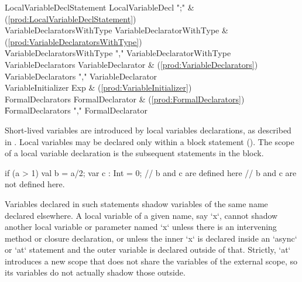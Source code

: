 \begin{bbgrammar}
LocalVariableDeclStatement \: LocalVariableDecl \xcd";" & (\ref{prod:LocalVariableDeclStatement}) \\
VariableDeclaratorsWithType \: VariableDeclaratorWithType & (\ref{prod:VariableDeclaratorsWithType}) \\
                    \| VariableDeclaratorsWithType \xcd"," VariableDeclaratorWithType \\
 VariableDeclarators \: VariableDeclarator & (\ref{prod:VariableDeclarators}) \\
                    \| VariableDeclarators \xcd"," VariableDeclarator \\
 VariableInitializer \: Exp & (\ref{prod:VariableInitializer}) \\
   FormalDeclarators \: FormalDeclarator & (\ref{prod:FormalDeclarators}) \\
                    \| FormalDeclarators \xcd"," FormalDeclarator \\
\end{bbgrammar}

Short-lived variables are introduced by local variables declarations, as
described in . Local variables may be declared only
within a block statement (). The scope of a local variable
declaration is the subsequent statements in the
block.   
\begin{xten}
  if (a > 1) {
     val b = a/2;
     var c : Int = 0;
     // b and c are defined here
  }
  // b and c are not defined here.
\end{xten}

Variables declared in such statements shadow variables of the same
name declared elsewhere.
A local variable of a given name, say \xcd`x`, cannot shadow another local
variable or parameter named \xcd`x` unless there is an intervening method or
closure declaration, or unless the inner \xcd`x` is declared inside an
\xcd`async` or \xcd`at` statement and the outer variable is declared outside
of that.   Strictly, \xcd`at` introduces a new scope that does not share the
variables of the external scope, so its variables do not actually shadow those
outside.  

